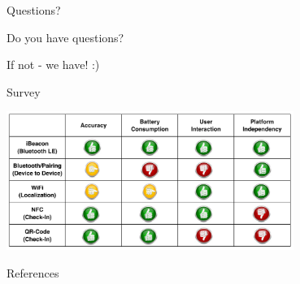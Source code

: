 \documentclass[12pt]{beamer}
\begin{document}
\begin{frame}{Questions?}

    \begin{center}

        {\Huge Do you have questions?}
        
        \vspace{1cm}
        
        {\Large If not - we have! :)}
        
    \end{center}

\end{frame}

\begin{frame}{Survey}

    \begin{center}

        \includegraphics[width=0.7\textwidth]{matrix}
        
    \end{center}

\end{frame}


\begin{frame}[allowframebreaks]{References}

	\nocite{*}
	

\end{frame}
\end{document}
